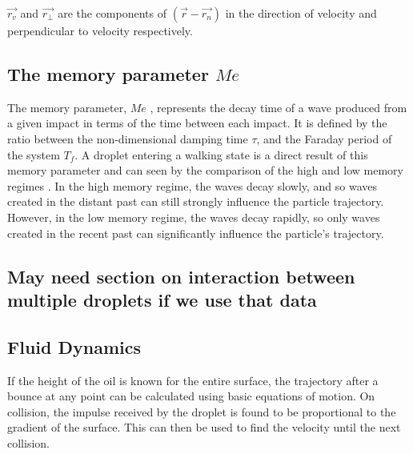 $\vec{r_v}$ and $\vec{r_{\perp}}$ are the components of $\left(\vec{r} - \vec{r_n}\right)$ in the direction of velocity and perpendicular to velocity respectively.

\subsection{The memory parameter $Me$}
The memory parameter,  $Me$ , represents the decay time of a wave produced from a given impact in terms of the time between each impact. It is defined by the ratio between the non-dimensional damping time $\tau$, and the Faraday period of the system $T_f$.
A droplet entering a walking state is a direct result of this memory parameter and can seen by the comparison of the high and low memory regimes \cite{couder11}.
In the high memory regime, the waves decay slowly, and so waves created in the distant past can still strongly influence the particle trajectory. However, in the low memory regime, the waves decay rapidly, so only waves created in the recent past can significantly influence the particle's trajectory. 


\subsection{May need section on interaction between multiple droplets if we use that data}
\subsection{Fluid Dynamics}
If the height of the oil is known for the entire surface, the trajectory after a bounce at any point can be calculated using basic equations of motion. On collision, the impulse received by the droplet is found to be proportional to the gradient of the surface. This can then be used to find the velocity until the next collision. 